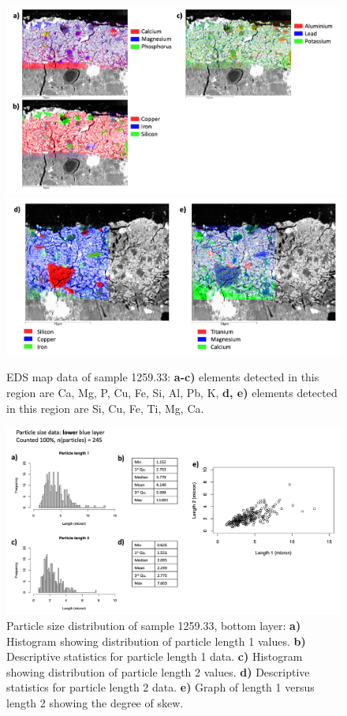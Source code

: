 \begin{figure}[H]
\centering
\begin{minipage}[t]{\linewidth}
  \centering
  \includegraphics[width=0.9\linewidth]{1259-33_mapdata_1}
\hfill
\includegraphics[width=0.9\linewidth]{1259-33_mapdata_2}
\hfill
\end{minipage}
\caption[EDS map data, sample 1259.33.]{EDS map data of sample 1259.33: \textbf{a-c)} elements detected in this region are Ca, Mg, P, Cu, Fe, Si, Al, Pb, K, \textbf{d, e)} elements detected in this region are Si, Cu, Fe, Ti, Mg, Ca.}
\label{fig:1259.33_mapdata}
\end{figure}

\begin{figure}[H]
\centering
  \includegraphics[width=\linewidth]{1259-33_partsize_1}
\caption[Particle size distribution, sample 1259.33, bottom layer.]{Particle size distribution of sample 1259.33, bottom layer: \textbf{a)} Histogram showing distribution of particle length 1 values. \textbf{b)} Descriptive statistics for particle length 1 data. \textbf{c)} Histogram showing distribution of particle length 2 values. \textbf{d)} Descriptive statistics for particle length 2 data. \textbf{e)} Graph of length 1 versus length 2 showing the degree of skew.}
\label{fig:1259.33_partsize_1}
\end{figure}

